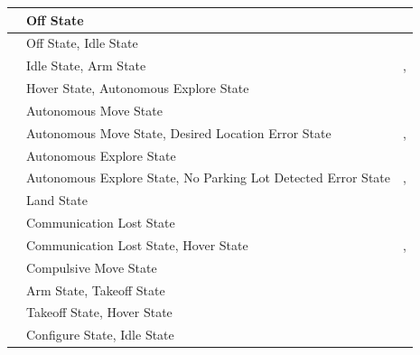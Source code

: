 \documentclass[12pt, titlepage]{article}
\begin{document}
\begin{table}[!h]
\begin{center}
\begin{tabular}{ | m{2.5cm} | m{7.5cm} | m{7.5cm} | }
\nameref{TRANS_001} & Off State & \nameref{FlightStates} \\ \hline
\nameref{TRANS_002} & Off State, Idle State & \nameref{NonFlightStates} \\ \hline
\nameref{TRANS_003} & Idle State, Arm State & \nameref{NonFlightStates}, \nameref{FlightStates} \\ \hline
\nameref{TRANS_004} & Hover State, Autonomous Explore State & \nameref{FlightStates} \\ \hline
\nameref{TRANS_005} & Autonomous Move State & \nameref{FlightStates} \\ \hline
\nameref{TRANS_006} & Autonomous Move State, Desired Location Error State & \nameref{FlightStates}, \nameref{ErrorStates} \\ \hline
\nameref{TRANS_007} & Autonomous Explore State & \nameref{FlightStates} \\ \hline
\nameref{TRANS_008} & Autonomous Explore State, No Parking Lot Detected Error State & \nameref{FlightStates}, \nameref{ErrorStates} \\ \hline
\nameref{TRANS_009} & Land State & \nameref{FlightStates} \\ \hline
\nameref{TRANS_010} & Communication Lost State & \nameref{ErrorStates} \\ \hline
\nameref{TRANS_011} & Communication Lost State, Hover State & \nameref{ErrorStates}, \nameref{FlightStates} \\ \hline
\nameref{TRANS_012} & Compulsive Move State & \nameref{FlightStates} \\ \hline
\nameref{TRANS_013} & Arm State, Takeoff State & \nameref{FlightStates} \\ \hline
\nameref{TRANS_014} & Takeoff State, Hover State & \nameref{FlightStates} \\ \hline
\nameref{TRANS_015} & Configure State, Idle State & \nameref{NonFlightStates} \\ \hline
\end{tabular}
\end{center}
\end{table}
\end{document}
